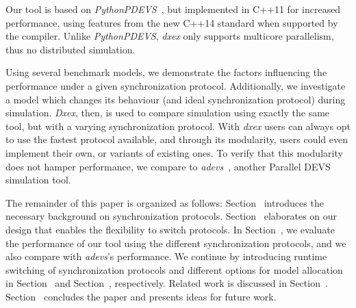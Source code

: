 Our tool is based on \textit{PythonPDEVS}~\cite{PythonPDEVS}, but implemented in C++11 for increased performance, using features from the new C++14 standard when supported by the compiler.
Unlike \textit{PythonPDEVS}, \textit{dxex} only supports multicore parallelism, thus no distributed simulation.

Using several benchmark models, we demonstrate the factors influencing the performance under a given synchronization protocol.
Additionally, we investigate a model which changes its behaviour (and ideal synchronization protocol) during simulation.
\textit{Dxex}, then, is used to compare simulation using exactly the same tool, but with a varying synchronization protocol.
With \textit{dxex} users can always opt to use the fastest protocol available, and through its modularity, users could even implement their own, or variants of existing ones.
To verify that this modularity does not hamper performance, we compare to \textit{adevs}~\cite{adevs}, another \textsf{Parallel DEVS} simulation tool.

The remainder of this paper is organized as follows:
Section~\textsc{} introduces the necessary background on synchronization protocols.
Section~\textsc{} elaborates on our design that enables the flexibility to switch protocols.
In Section~\textsc{}, we evaluate the performance of our tool using the different synchronization protocols, and we also compare with \textit{adevs}'s performance.
We continue by introducing runtime switching of synchronization protocols and different options for model allocation in Section~\textsc{} and Section~\textsc{}, respectively.
Related work is discussed in Section~\textsc{}.
Section~\textsc{} concludes the paper and presents ideas for future work.
